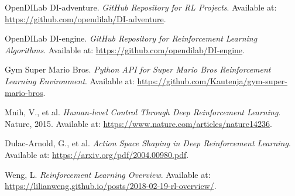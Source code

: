\documentclass[12pt]{article}
\begin{document}
\begin{thebibliography}{9}

    OpenDILab DI-adventure. 
    \textit{GitHub Repository for RL Projects}. 
    Available at: \url{https://github.com/opendilab/DI-adventure}.
    
    OpenDILab DI-engine. 
    \textit{GitHub Repository for Reinforcement Learning Algorithms}. 
    Available at: \url{https://github.com/opendilab/DI-engine}.
    
    Gym Super Mario Bros. 
    \textit{Python API for Super Mario Bros Reinforcement Learning Environment}. 
    Available at: \url{https://github.com/Kautenja/gym-super-mario-bros}.
    
    Mnih, V., et al. 
    \textit{Human-level Control Through Deep Reinforcement Learning}. 
    Nature, 2015. 
    Available at: \url{https://www.nature.com/articles/nature14236}.
    
    Dulac-Arnold, G., et al. 
    \textit{Action Space Shaping in Deep Reinforcement Learning}. 
    Available at: \url{https://arxiv.org/pdf/2004.00980.pdf}.
    
    Weng, L. 
    \textit{Reinforcement Learning Overview}. 
    Available at: \url{https://lilianweng.github.io/posts/2018-02-19-rl-overview/}.
    
    \end{thebibliography}
    
\end{document}
